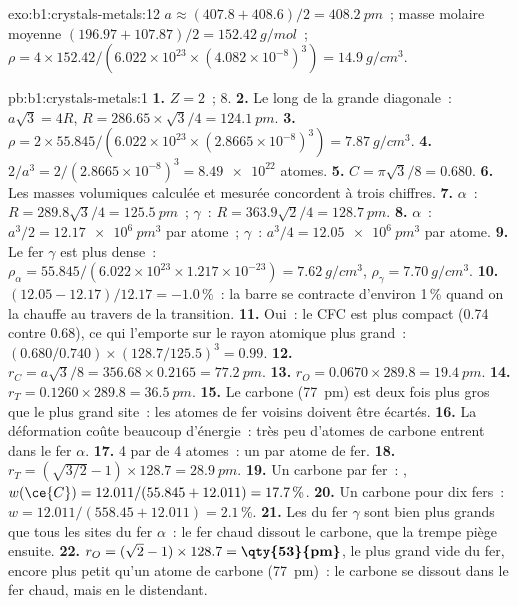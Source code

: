 \begin{solution}{exo:b1:crystals-metals:12}
$a \approx (407.8 + 408.6)/2 = \qty{408.2}{pm}$~; masse molaire moyenne $(196.97 +
107.87)/2 = \qty{152.42}{g/mol}$~; $\rho = 4 \times 152.42/(6.022 \times
10^{23} \times (4.082 \times 10^{-8})^3) = \qty{14.9}{g/cm^3}$.
\end{solution}

\begin{solution}{pb:b1:crystals-metals:1}
\textbf{1.} $Z = 2$~;  8.
\textbf{2.} Le long de la grande diagonale~: $a\sqrt3 = 4R$, $R = 286.65 \times
\sqrt3/4 = \qty{124.1}{pm}$.
\textbf{3.} $\rho = 2 \times 55.845/(6.022 \times 10^{23} \times (2.8665
\times 10^{-8})^3) = \qty{7.87}{g/cm^3}$.
\textbf{4.} $2/a^3 = 2/(2.8665 \times 10^{-8})^3 = \num{8.49e22}$ atomes.
\textbf{5.} $C = \pi\sqrt3/8 = 0.680$.
\textbf{6.} Les masses volumiques calculée et mesurée concordent à trois
chiffres.
\textbf{7.} $\alpha$~: $R = 289.8\sqrt3/4 = \qty{125.5}{pm}$~; $\gamma$~:
$R = 363.9\sqrt2/4 = \qty{128.7}{pm}$.
\textbf{8.} $\alpha$~: $a^3/2 = \qty{12.17e6}{pm^3}$ par atome~; $\gamma$~:
$a^3/4 = \qty{12.05e6}{pm^3}$ par atome.
\textbf{9.} Le fer $\gamma$ est plus dense~: $\rho_\alpha = 55.845/(6.022 \times 10^{23}
\times 1.217 \times 10^{-23}) = \qty{7.62}{g/cm^3}$, $\rho_\gamma =
\qty{7.70}{g/cm^3}$.
\textbf{10.} $(12.05 - 12.17)/12.17 = -1.0\,\%$~: la barre se contracte
d'environ 1\,\% quand on la chauffe au travers de la transition.
\textbf{11.} Oui~: le CFC est plus compact (0.74 contre 0.68), ce qui
l'emporte sur le rayon atomique plus grand~:
$(0.680/0.740) \times (128.7/125.5)^3 = 0.99$.
\textbf{12.} $r_C = a\sqrt3/8 = 356.68 \times 0.2165 = \qty{77.2}{pm}$.
\textbf{13.} $r_O = 0.0670 \times 289.8 = \qty{19.4}{pm}$.
\textbf{14.} $r_T = 0.1260 \times 289.8 = \qty{36.5}{pm}$.
\textbf{15.} Le carbone (\qty{77}{pm}) est deux fois plus gros que le
plus grand site~: les atomes de fer voisins doivent être écartés.
\textbf{16.} La déformation coûte beaucoup d'énergie~: très peu d'atomes
de carbone entrent dans le fer $\alpha$.
\textbf{17.} 4  par  de 4 atomes~: un par atome
de fer.
\textbf{18.} $r_T = (\sqrt{3/2} - 1) \times 128.7 = \qty{28.9}{pm}$.
\textbf{19.} Un carbone par fer~: , $w(\ce{C}) = 12.011/(55.845 +
12.011) = 17.7\,\%$.
\textbf{20.} Un carbone pour dix fers~: $w = 12.011/(558.45 + 12.011) =
2.1\,\%$.
\textbf{21.} Les  du fer $\gamma$ sont bien plus grands
que tous les sites du fer $\alpha$~: le fer chaud dissout le carbone, que
la trempe piège ensuite.
\textbf{22.} $r_O = (\sqrt2 - 1) \times 128.7 = \textbf{\qty{53}{pm}}$, le
plus grand vide du fer, encore plus petit qu'un atome de carbone
(\qty{77}{pm})~: le carbone se dissout dans le fer chaud, mais en le
distendant.
\end{solution}
